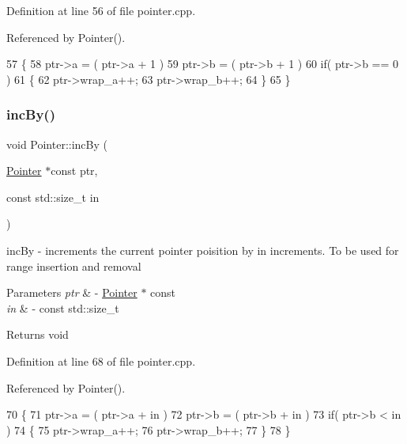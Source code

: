 Definition at line 56 of file pointer.\+cpp.



Referenced by Pointer().


\begin{DoxyCode}
57 \{
58    ptr->a = ( ptr->a + 1 ) %
59    ptr->b = ( ptr->b + 1 ) %
60    \textcolor{keywordflow}{if}( ptr->b == 0 )
61    \{
62       ptr->wrap\_a++;
63       ptr->wrap\_b++;
64    \}
65 \}
\end{DoxyCode}
\hypertarget{class_pointer_af2a6fd4fb44c191ae8f76898d8626be0}{}\label{class_pointer_af2a6fd4fb44c191ae8f76898d8626be0} 
\subsubsection{\texorpdfstring{inc\+By()}{incBy()}}
{\footnotesize\ttfamily void Pointer\+::inc\+By (\begin{DoxyParamCaption}\item[{\hyperlink{class_pointer}{Pointer} $\ast$const}]{ptr,  }\item[{const std\+::size\+\_\+t}]{in }\end{DoxyParamCaption})\hspace{0.3cm}{\ttfamily [static]}}

inc\+By -\/ increments the current pointer poisition by \textquotesingle{}in\textquotesingle{} increments. To be used for range insertion and removal 
\begin{DoxyParams}{Parameters}
{\em ptr} & -\/ \hyperlink{class_pointer}{Pointer} $\ast$ const \\
\hline
{\em in} & -\/ const std\+::size\+\_\+t \\
\hline
\end{DoxyParams}
\begin{DoxyReturn}{Returns}
void 
\end{DoxyReturn}


Definition at line 68 of file pointer.\+cpp.



Referenced by Pointer().


\begin{DoxyCode}
70 \{
71    ptr->a = ( ptr->a + in ) %
72    ptr->b = ( ptr->b + in ) %
73    \textcolor{keywordflow}{if}( ptr->b < in )
74    \{
75       ptr->wrap\_a++;
76       ptr->wrap\_b++;
77    \}
78 \}
\end{DoxyCode}
\hypertarget{class_pointer_a27de62075753297225ad8217ba123307}{}\label{class_pointer_a27de62075753297225ad8217ba123307} 
